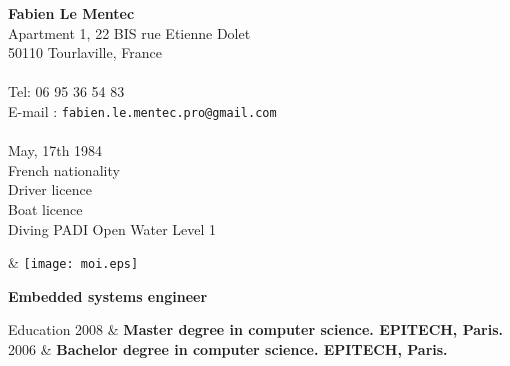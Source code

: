 \documentclass{resume}
\newcommand{\activite}[1]{\textbf{#1}\ }
\begin{document}
\begin{chapeau}
  \begin{adresse}
    \textbf{Fabien Le Mentec}\\
    Apartment 1, 22 BIS rue Etienne Dolet \\
    50110 Tourlaville, France	\\
    \ligne\\
    Tel: 06 95 36 54 83\\
    E-mail : \texttt{fabien.le.mentec.pro@gmail.com}\\
    \ligne\\
    May, 17th 1984 \\
    French nationality \\
    Driver licence \\
    Boat licence \\
    Diving PADI Open Water Level 1
  \end{adresse}
  \begin{etatcivil}
    & \texttt{[image: moi.eps]}\\[2mm]
  \end{etatcivil}
\end{chapeau}

\vspace{0.4cm}

\begin{center}
  \textbf{\huge{Embedded systems engineer}}
\end{center}

\vspace{0.6cm}

\begin{rubriquetableau}[2cm]{Education}
  2008
  & \activite{\small{Master degree in computer science. EPITECH, Paris.}}
  \\[0.5mm]

  2006
  & \activite{\small{Bachelor degree in computer science. EPITECH, Paris.}}
  \\[0.5mm]

\end{rubriquetableau}

\vspace{0.6cm}
\end{document}
